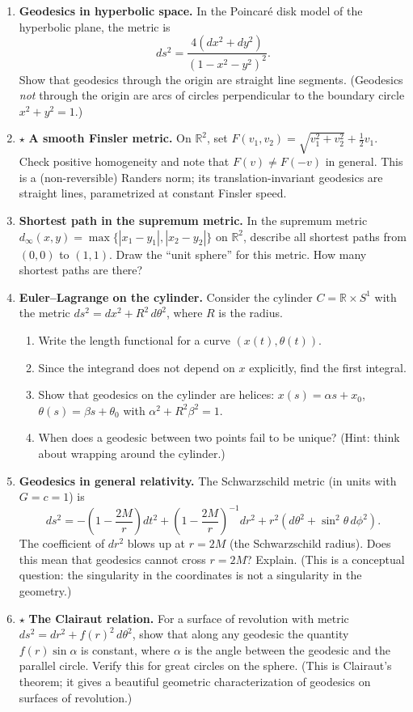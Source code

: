 \begin{enumerate}
    \item \textbf{Geodesics in hyperbolic space.} In the Poincar\'e disk model of the hyperbolic plane, the metric is
    \[
        ds^2 = \frac{4(dx^2 + dy^2)}{(1 - x^2 - y^2)^2}.
    \]
    Show that geodesics through the origin are straight line segments. (Geodesics \emph{not} through the origin are arcs of circles perpendicular to the boundary circle $x^2 + y^2 = 1$.)

    \item $\star$ \textbf{A smooth Finsler metric.} On $\mathbb{R}^2$, set $F(v_1,v_2)=\sqrt{v_1^2+v_2^2}+\tfrac12 v_1$. Check positive homogeneity and note that $F(v)\neq F(-v)$ in general. This is a (non-reversible) Randers norm; its translation-invariant geodesics are straight lines, parametrized at constant Finsler speed.

    \item \textbf{Shortest path in the supremum metric.} In the supremum metric $d_\infty(x,y) = \max\{|x_1-y_1|,|x_2-y_2|\}$ on $\mathbb{R}^2$, describe all shortest paths from $(0,0)$ to $(1,1)$. Draw the ``unit sphere'' for this metric. How many shortest paths are there?

    \item \textbf{Euler--Lagrange on the cylinder.} Consider the cylinder $C = \mathbb{R} \times S^1$ with the metric $ds^2 = dx^2 + R^2\,d\theta^2$, where $R$ is the radius.
    \begin{enumerate}
        \item Write the length functional for a curve $(x(t), \theta(t))$.
        \item Since the integrand does not depend on $x$ explicitly, find the first integral.
        \item Show that geodesics on the cylinder are helices: $x(s) = \alpha s + x_0$, $\theta(s) = \beta s + \theta_0$ with $\alpha^2 + R^2\beta^2 = 1$.
        \item When does a geodesic between two points fail to be unique? (Hint: think about wrapping around the cylinder.)
    \end{enumerate}

    \item \textbf{Geodesics in general relativity.} The Schwarzschild metric (in units with $G=c=1$) is
    \[
    ds^2 = -\left(1-\frac{2M}{r}\right)dt^2 + \left(1-\frac{2M}{r}\right)^{-1}dr^2 + r^2(d\theta^2 + \sin^2\theta\,d\phi^2).
    \]
    The coefficient of $dr^2$ blows up at $r = 2M$ (the Schwarzschild radius). Does this mean that geodesics cannot cross $r = 2M$? Explain. (This is a conceptual question: the singularity in the coordinates is not a singularity in the geometry.)

    \item $\star$ \textbf{The Clairaut relation.} For a surface of revolution with metric $ds^2 = dr^2 + f(r)^2\,d\theta^2$, show that along any geodesic the quantity $f(r)\sin\alpha$ is constant, where $\alpha$ is the angle between the geodesic and the parallel circle. Verify this for great circles on the sphere. (This is Clairaut's theorem; it gives a beautiful geometric characterization of geodesics on surfaces of revolution.)

\end{enumerate}
